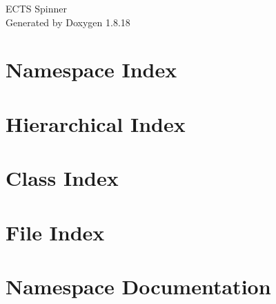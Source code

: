 \let\mypdfximage\pdfximage\def\pdfximage{\immediate\mypdfximage}\documentclass[twoside]{book}
\newcommand{\+}{\discretionary{\mbox{\scriptsize$\hookleftarrow$}}{}{}}
\newcommand{\clearemptydoublepage}{%
  \newpage{\pagestyle{empty}\cleardoublepage}%
}
\begin{document}
\begin{titlepage}
\vspace*{7cm}
\begin{center}%
{\Large E\+C\+TS Spinner }\\
\vspace*{1cm}
{\large Generated by Doxygen 1.8.18}\\
\end{center}
\end{titlepage}
\clearemptydoublepage
{}
\tableofcontents
\clearemptydoublepage
{}

\chapter{Namespace Index}

\chapter{Hierarchical Index}

\chapter{Class Index}

\chapter{File Index}

\chapter{Namespace Documentation}


















\end{document}
